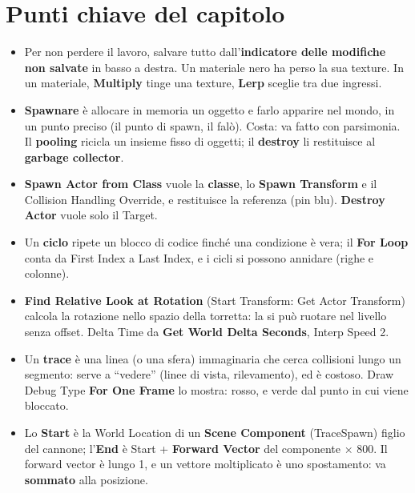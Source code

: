 \section*{Punti chiave del capitolo}

\begin{itemize}
  \item Per non perdere il lavoro, salvare tutto dall'\textbf{indicatore delle modifiche
        non salvate} in basso a destra. Un materiale nero ha perso la sua texture. In un
        materiale, \textbf{Multiply} tinge una texture, \textbf{Lerp} sceglie tra due
        ingressi.
  \item \textbf{Spawnare} è allocare in memoria un oggetto e farlo apparire nel mondo, in
        un punto preciso (il punto di spawn, il falò). Costa: va fatto con parsimonia. Il
        \textbf{pooling} ricicla un insieme fisso di oggetti; il \textbf{destroy} li
        restituisce al \textbf{garbage collector}.
  \item \textbf{Spawn Actor from Class} vuole la \textbf{classe}, lo \textbf{Spawn
        Transform} e il Collision Handling Override, e restituisce la referenza (pin
        blu). \textbf{Destroy Actor} vuole solo il Target.
  \item Un \textbf{ciclo} ripete un blocco di codice finché una condizione è vera; il
        \textbf{For Loop} conta da First Index a Last Index, e i cicli si possono
        annidare (righe e colonne).
  \item \textbf{Find Relative Look at Rotation} (Start Transform: Get Actor Transform)
        calcola la rotazione nello spazio della torretta: la si può ruotare nel livello
        senza offset. Delta Time da \textbf{Get World Delta Seconds}, Interp Speed 2.
  \item Un \textbf{trace} è una linea (o una sfera) immaginaria che cerca collisioni
        lungo un segmento: serve a ``vedere'' (linee di vista, rilevamento), ed è
        costoso. Draw Debug Type \textbf{For One Frame} lo mostra: rosso, e verde dal
        punto in cui viene bloccato.
  \item Lo \textbf{Start} è la World Location di un \textbf{Scene Component} (TraceSpawn)
        figlio del cannone; l'\textbf{End} è Start + \textbf{Forward Vector} del
        componente $\times$ 800. Il forward vector è lungo 1, e un vettore moltiplicato è
        uno spostamento: va \textbf{sommato} alla posizione.

\end{itemize}
